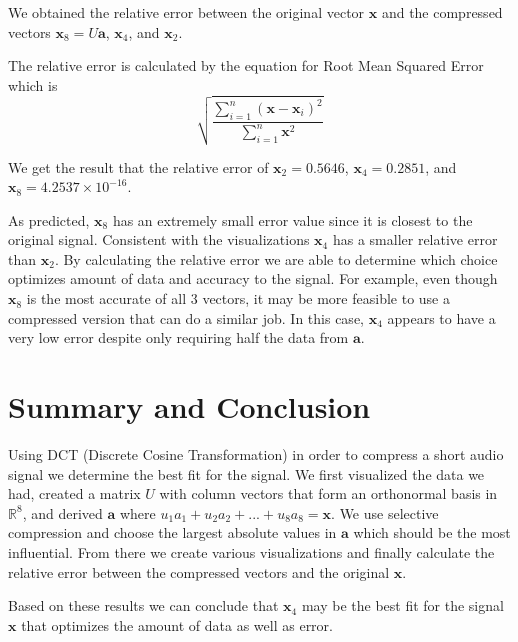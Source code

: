 \documentclass{article}
\newcommand{\bs}[1]{\boldsymbol{#1}}
\begin{document}
We obtained the relative error between the original vector $\bs{x}$ and the compressed vectors $\bs{x}_8 = U\bs{a}$, $\bs{x}_4$, and $\bs{x}_2$.

The relative error is calculated by the equation for Root Mean Squared Error which is 
$$\sqrt{\frac{\sum_{i=1}^{n} (\bs{x} - \bs{x}_{i})^2}{\sum_{i=1}^{n} \bs{x}^2}}$$ 

We get the result that the relative error of $\bs{x}_2 = 0.5646$, $\bs{x}_4 = 0.2851$, and $\bs{x}_8 = 4.2537 \times 10^{-16}$.

As predicted, $\bs{x}_8$ has an extremely small error value since it is closest to the original signal. Consistent with the visualizations $\bs{x}_4$ has a smaller relative error than $\bs{x}_2$. By calculating the relative error we are able to determine which choice optimizes amount of data and accuracy to the signal. For example, even though $\bs{x}_8$ is the most accurate of all 3 vectors, it may be more feasible to use a compressed version that can do a similar job. In this case,  $\bs{x}_4$ appears to have a very low error despite only requiring half the data from $\bs{a}$.

\section{Summary and Conclusion}

Using DCT (Discrete Cosine Transformation) in order to compress a short audio signal we determine the best fit for the signal. We first visualized the data we had, created a matrix $U$ with column vectors that form an orthonormal basis in $\mathbb{R}^8$, and derived $\bs{a}$ where $u_1a_1+u_2a_2+...+u_8a_8=\bs{x}$. We use selective compression and choose the largest absolute values in $\bs{a}$ which should be the most influential. From there we create various visualizations and finally calculate the relative error between the compressed vectors and the original $\bs{x}$.

Based on these results we can conclude that $\bs{x}_4$ may be the best fit for the signal $\bs{x}$ that optimizes the amount of data as well as error. 
\end{document}
